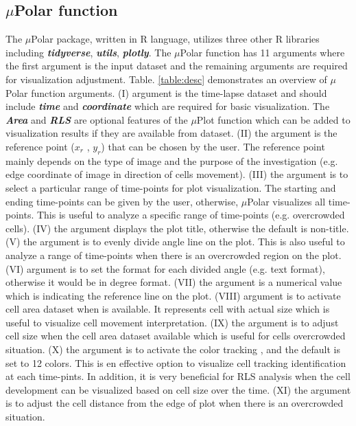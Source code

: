 \documentclass[conference]{IEEEtran}
\begin{document}
 
 
\subsection{$\mu$Polar function}
The $\mu$Polar package, written in R language, utilizes three other R libraries including \textbf{\textit{tidyverse}}, \textbf{\textit{utils}}, \textbf{\textit{plotly}}. The $\mu$Polar function has 11 arguments where the first argument is the input dataset and the remaining arguments are required for visualization adjustment. Table. \ref{table:desc} demonstrates an overview of $\mu$Polar function arguments. (I) argument is the time-lapse dataset and should include \textbf{\textit{time}} and \textbf{\textit{coordinate}} which are required for basic visualization. The \textbf{\textit{Area}} and \textbf{\textit{RLS}} are optional features of the $\mu$Plot function which can be added to visualization results if they are available from dataset. (II) the argument is the reference point ($x_r$ , $y_r$) that can be chosen by the user. The reference point mainly depends on the type of image and the purpose of the investigation (e.g. edge coordinate of image in direction of cells movement). (III) the argument is to select a particular range of time-points for plot visualization. The starting and ending time-points can be given by the user, otherwise, $\mu$Polar visualizes all time-points. This is useful to analyze a specific range of time-points (e.g. overcrowded cells). (IV) the argument displays the plot title, otherwise the default is non-title. (V) the argument is to evenly divide angle line on the plot. This is also useful to analyze a range of time-points when there is an overcrowded region on the plot. (VI) argument is to set the format for each divided angle (e.g. text format), otherwise it would be in degree format. (VII) the argument is a numerical value  which is indicating the reference line on the plot. (VIII) argument is to activate cell area dataset  when is available. It represents cell with actual size which is useful to visualize cell movement interpretation. (IX) the argument is to adjust cell size when the cell area dataset available which is useful for cells overcrowded situation. (X) the argument is to activate the color tracking , and the default is set to 12 colors. This is en effective option to visualize cell tracking identification at each time-pints. In addition, it is very beneficial for RLS analysis when the cell development can be visualized based on cell size over the time. (XI) the argument is to adjust the cell distance from the edge of plot when there is an overcrowded situation. 
\end{document}

